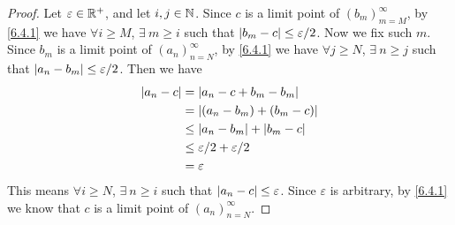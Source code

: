 \begin{proof}
  Let \(\varepsilon \in \mathbb{R}^+\), and let \(i, j \in \mathbb{N}\).
  Since \(c\) is a limit point of \((b_m)_{m = M}^\infty\), by \cref{6.4.1} we have \(\forall i \geq M\), \(\exists\ m \geq i\) such that \(\left\lvert b_m - c\right\rvert \leq \varepsilon / 2\).
  Now we fix such \(m\).
  Since \(b_m\) is a limit point of \((a_n)_{n = N}^\infty\), by \cref{6.4.1} we have \(\forall j \geq N\), \(\exists\ n \geq j\) such that \(\left\lvert a_n - b_m\right\rvert \leq \varepsilon / 2\).
  Then we have
  \begin{align*}
    \left\lvert a_n - c\right\rvert & = \left\lvert a_n - c + b_m - b_m\right\rvert            \\
                  & = \left\lvert(a_n - b_m) + (b_m - c)\right\rvert        \\
                  & \leq \left\lvert a_n - b_m\right\rvert + \left\lvert b_m - c\right\rvert   \\
                  & \leq \varepsilon / 2 + \varepsilon / 2 \\
                  & = \varepsilon
  \end{align*}
  This means \(\forall i \geq N\), \(\exists\ n \geq i\) such that \(\left\lvert a_n - c\right\rvert \leq \varepsilon\).
  Since \(\varepsilon\) is arbitrary, by \cref{6.4.1} we know that \(c\) is a limit point of \((a_n)_{n = N}^\infty\).
\end{proof}